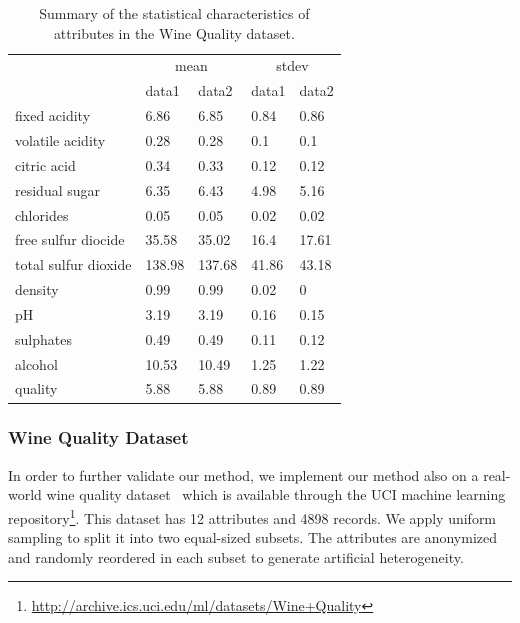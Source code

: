 \begin{table}[tbh]
\begin{center}
\begin{tabular}{l||l|l||l|l}
\hline
 & \multicolumn{2}{c||}{mean} & \multicolumn{2}{c}{stdev}\\
\cline{2-5}
 & data1 & data2 & data1 & data2\\
\hline
\hline
fixed acidity & 6.86 & 6.85 & 0.84 & 0.86\\
volatile acidity & 0.28 & 0.28 & 0.1 & 0.1\\
citric acid & 0.34 & 0.33 & 0.12 & 0.12\\
residual sugar & 6.35 & 6.43 & 4.98 & 5.16\\
chlorides & 0.05 & 0.05 & 0.02 & 0.02\\
free sulfur diocide & 35.58 & 35.02 & 16.4 & 17.61\\
total sulfur dioxide & 138.98 & 137.68 & 41.86 & 43.18\\
density & 0.99 & 0.99 & 0.02 & 0\\
pH & 3.19 & 3.19 & 0.16 & 0.15\\
sulphates & 0.49 & 0.49 & 0.11 & 0.12\\
alcohol & 10.53 & 10.49 & 1.25 & 1.22\\
quality & 5.88 & 5.88 & 0.89 & 0.89\\
\hline
\end{tabular}
\end{center}
\caption{\label{tbl:wine_stat} Summary of the statistical characteristics of attributes in the Wine Quality dataset.}
\end{table}

\subsubsection{Wine Quality Dataset}
In order to further validate our method, we implement our method also on a real-world wine quality dataset~\cite{CorCer09} which is available through the UCI machine learning repository\footnote[1]{\url{http://archive.ics.uci.edu/ml/datasets/Wine+Quality}}. This dataset has 12 attributes and 4898 records. We apply uniform sampling to split it into two equal-sized subsets. The attributes are anonymized and randomly reordered in each subset to generate artificial heterogeneity.

